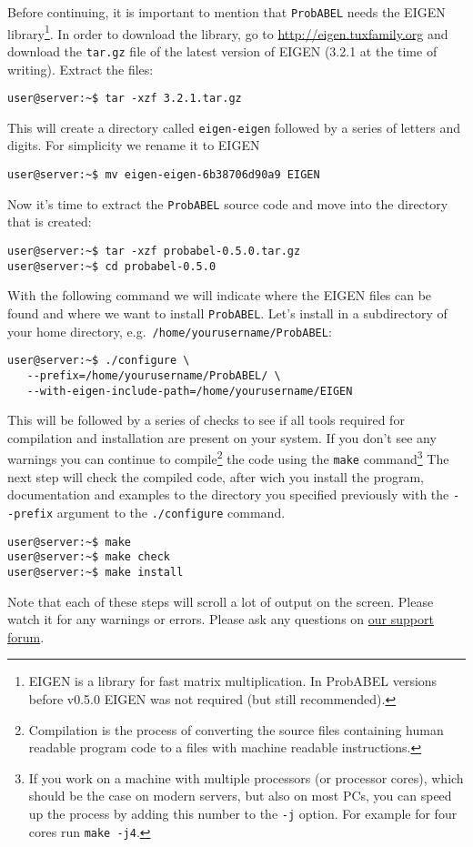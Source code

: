\documentclass[12pt,a4paper]{article}
\newcommand{\PA}{\texttt{ProbABEL}}
\begin{document}
Before continuing, it is important to mention that \PA{} needs the
EIGEN library\footnote{EIGEN is a library for fast matrix
  multiplication. In ProbABEL versions before v0.5.0 EIGEN was not
  required (but still recommended).}. In order to download the
library, go to \url{http://eigen.tuxfamily.org} and download the
\texttt{tar.gz} file of the latest version of EIGEN (3.2.1 at the time
of writing). Extract the files:
\begin{lstlisting}[basicstyle=\footnotesize\ttfamily,]
user@server:~$ tar -xzf 3.2.1.tar.gz
\end{lstlisting}
This will create a directory called \texttt{eigen-eigen} followed by a
series of letters and digits. For simplicity we rename it to EIGEN
\begin{lstlisting}[basicstyle=\footnotesize\ttfamily,]
user@server:~$ mv eigen-eigen-6b38706d90a9 EIGEN
\end{lstlisting}

Now it's time to extract the \PA{} source code and move into the
directory that is created:
\begin{lstlisting}[basicstyle=\footnotesize\ttfamily,]
user@server:~$ tar -xzf probabel-0.5.0.tar.gz
user@server:~$ cd probabel-0.5.0
\end{lstlisting}
With the following command we will indicate where the EIGEN files can
be found and where we want to install \PA{}. Let's install in a
subdirectory of your home directory,
e.g.~\texttt{/home/yourusername/ProbABEL}:
\begin{lstlisting}[basicstyle=\footnotesize\ttfamily,]
user@server:~$ ./configure \
   --prefix=/home/yourusername/ProbABEL/ \
   --with-eigen-include-path=/home/yourusername/EIGEN
\end{lstlisting}
This will be followed by a series of checks to see if all tools
required for compilation and installation are present on your
system. If you don't see any warnings you can continue to
compile\footnote{Compilation is the process of converting the source
  files containing human readable program code to a files with machine
  readable instructions.} the code using the \texttt{make}
command\footnote{If you work on a machine with multiple processors (or
  processor cores), which should be the case on modern servers, but
  also on most PCs, you can speed up the process by adding this number
  to the \texttt{-j} option. For example for four cores run
  \texttt{make -j4}.} The next step will check the compiled code,
after wich you install the program, documentation and examples to the
directory you specified previously with the \lstinline{--prefix} argument
to the \texttt{./configure} command.
\begin{lstlisting}[basicstyle=\footnotesize\ttfamily,]
user@server:~$ make
user@server:~$ make check
user@server:~$ make install
\end{lstlisting}
Note that each of these steps will scroll a lot of output on the
screen. Please watch it for any warnings or errors. Please ask any
questions on \href{http://forum.genabel.org/}{our support forum}.
\end{document}
